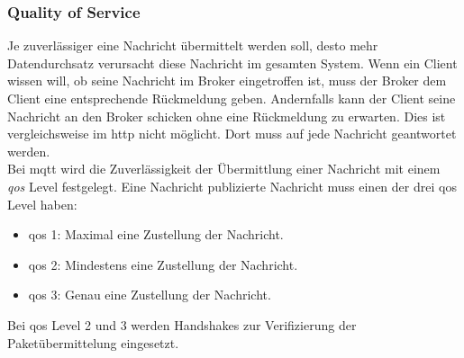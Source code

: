 \subsubsection{Quality of Service} \label{s:qos}
Je zuverlässiger eine Nachricht übermittelt werden soll, desto mehr Datendurchsatz verursacht diese Nachricht im gesamten System. Wenn ein Client wissen will, ob seine Nachricht im Broker eingetroffen ist, muss der Broker dem Client eine entsprechende Rückmeldung geben. Andernfalls kann der Client seine Nachricht an den Broker schicken ohne eine Rückmeldung zu erwarten. Dies ist vergleichsweise im \ac{http} nicht möglicht. Dort muss auf jede Nachricht geantwortet werden.\\
Bei \ac{mqtt} wird die Zuverlässigkeit der Übermittlung einer Nachricht mit einem \textit{\acf{qos}} Level festgelegt. Eine Nachricht publizierte Nachricht muss einen der drei \ac{qos} Level haben:
\begin{itemize}
    \item \ac{qos} 1: Maximal eine Zustellung der Nachricht.
    \item \ac{qos} 2: Mindestens eine Zustellung der Nachricht.
    \item \ac{qos} 3: Genau eine Zustellung der Nachricht.
\end{itemize}
Bei \ac{qos} Level 2 und 3 werden Handshakes zur Verifizierung der Paketübermittelung eingesetzt.\cite{mqtt5Specification}

